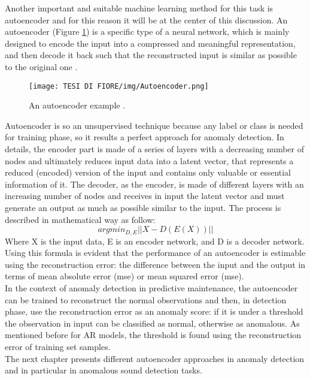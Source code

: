Another important and suitable machine learning method for this task is autoencoder and for this reason it will be at the center of this discussion. 
An autoencoder (Figure \ref{autoencoder_image}) is a specific type of a neural network, which is mainly designed to encode the input into a compressed and meaningful representation, and then decode it back such that the reconstructed input is similar as possible to the original one \cite{10Autoencoders}.\\
\begin{figure}[ht]
\texttt{[image: TESI DI FIORE/img/Autoencoder.png]}
\centering
\caption{An autoencoder example \cite{10Autoencoders}.}
\label{autoencoder_image}
\end{figure}
Autoencoder is so an unsupervised technique because any label or class is needed for training phase, so it results a perfect approach for anomaly detection. In details, the encoder part is made of a series of layers with a decreasing number of nodes and ultimately reduces input data into a latent vector, that represents a reduced (encoded) version of the input and contains only valuable or essential information of it. The decoder, as the encoder, is made of different layers with an increasing number of nodes and receives in input the latent vector and must generate an output as much as possible similar to the input. The process is described in mathematical way as follow:
\[argmin_{D,E} || X - D(E(X))||\]
Where X is the input data, E is an encoder network, and D is a decoder network. Using this formula is evident that the performance of an autoencoder is estimable using the reconstruction error: the difference between the input and the output in terms of mean absolute error (mse) or mean squared error (mse).\\
In the context of anomaly detection in predictive maintenance, the autoencoder can be trained to reconstruct the normal observations and then, in detection phase, use the reconstruction error as an anomaly score: if it is under a threshold the observation in input can be classified as normal, otherwise as anomalous. As mentioned before for AR models, the threshold is found using the reconstruction error of training set samples.\\
The next chapter presents different autoencoder approaches in anomaly detection and in particular in anomalous sound detection tasks.


